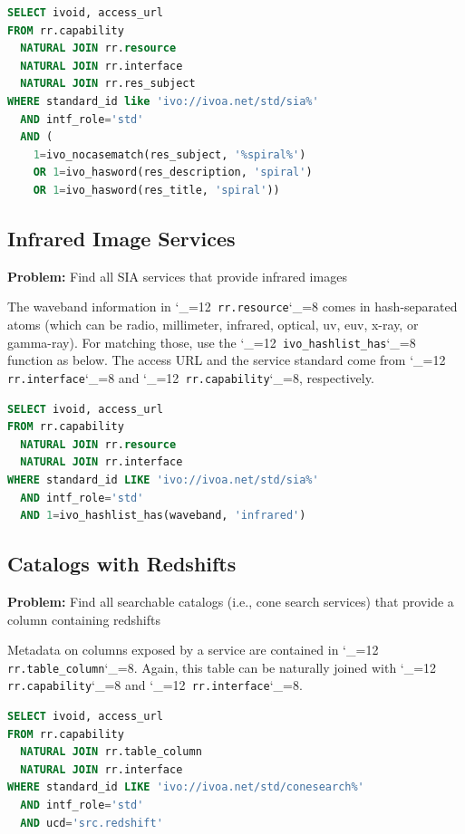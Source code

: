 \documentclass[11pt,a4paper]{ivoa}
\makeatletter
\def\rtent#1{\texttt{\color{rtcolor}\verb|#1|}}
\def\makeunderscoreletter{\catcode`\_=12}
\def\makeunderscoresubscript{\catcode`\_=8}
\def\rtent{\makeunderscoreletter\relax\rt@nt}
\def\rt@nt#1{\texttt{\color{rtcolor} #1}\makeunderscoresubscript{}}
\makeatother
\begin{document}
\begin{lstlisting}[language=SQL,flexiblecolumns=true]
SELECT ivoid, access_url
FROM rr.capability
  NATURAL JOIN rr.resource
  NATURAL JOIN rr.interface
  NATURAL JOIN rr.res_subject
WHERE standard_id like 'ivo://ivoa.net/std/sia%'
  AND intf_role='std'
  AND (
    1=ivo_nocasematch(res_subject, '%spiral%')
    OR 1=ivo_hasword(res_description, 'spiral')
    OR 1=ivo_hasword(res_title, 'spiral'))
\end{lstlisting}


\subsection{Infrared Image Services}

\textbf{Problem:} Find all SIA services that provide infrared
images

The waveband information in
\rtent{rr.resource}
comes in hash-separated atoms (which can be
radio, millimeter, infrared, optical, uv, euv, x-ray, or gamma-ray).
For matching those, use the \rtent{ivo_hashlist_has} function as
below.  The access URL and the service standard come from
\rtent{rr.interface} and
\rtent{rr.capability}, respectively.


\begin{lstlisting}[language=SQL,flexiblecolumns=true]
SELECT ivoid, access_url
FROM rr.capability
  NATURAL JOIN rr.resource
  NATURAL JOIN rr.interface
WHERE standard_id LIKE 'ivo://ivoa.net/std/sia%'
  AND intf_role='std'
  AND 1=ivo_hashlist_has(waveband, 'infrared')
\end{lstlisting}

\subsection{Catalogs with Redshifts}
\textbf{Problem:} Find all searchable catalogs (i.e., cone search
services) that provide a column containing redshifts

Metadata on columns exposed by a service are contained in
\rtent{rr.table_column}.  Again, this table can be
naturally joined with
\rtent{rr.capability} and
\rtent{rr.interface}.

\begin{lstlisting}[language=SQL,flexiblecolumns=true]
SELECT ivoid, access_url
FROM rr.capability
  NATURAL JOIN rr.table_column
  NATURAL JOIN rr.interface
WHERE standard_id LIKE 'ivo://ivoa.net/std/conesearch%'
  AND intf_role='std'
  AND ucd='src.redshift'
\end{lstlisting}
\end{document}
